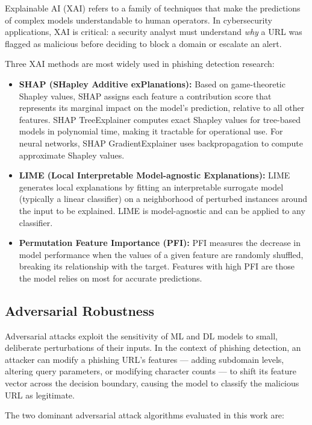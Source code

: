 Explainable AI (XAI) refers to a family of techniques that make the predictions of complex models understandable to human operators. In cybersecurity applications, XAI is critical: a security analyst must understand \textit{why} a URL was flagged as malicious before deciding to block a domain or escalate an alert.

Three XAI methods are most widely used in phishing detection research:

\begin{itemize}
    \item \textbf{SHAP (SHapley Additive exPlanations):} Based on game-theoretic Shapley values, SHAP assigns each feature a contribution score that represents its marginal impact on the model's prediction, relative to all other features. SHAP TreeExplainer computes exact Shapley values for tree-based models in polynomial time, making it tractable for operational use. For neural networks, SHAP GradientExplainer uses backpropagation to compute approximate Shapley values.
    \item \textbf{LIME (Local Interpretable Model-agnostic Explanations):} LIME generates local explanations by fitting an interpretable surrogate model (typically a linear classifier) on a neighborhood of perturbed instances around the input to be explained. LIME is model-agnostic and can be applied to any classifier.
    \item \textbf{Permutation Feature Importance (PFI):} PFI measures the decrease in model performance when the values of a given feature are randomly shuffled, breaking its relationship with the target. Features with high PFI are those the model relies on most for accurate predictions.
\end{itemize}

\subsection{Adversarial Robustness}

Adversarial attacks exploit the sensitivity of ML and DL models to small, deliberate perturbations of their inputs. In the context of phishing detection, an attacker can modify a phishing URL's features — adding subdomain levels, altering query parameters, or modifying character counts — to shift its feature vector across the decision boundary, causing the model to classify the malicious URL as legitimate.

The two dominant adversarial attack algorithms evaluated in this work are:

